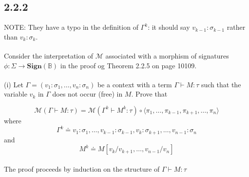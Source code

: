\documentclass{article}
\newcommand{\mbf}{\mathbf}
\begin{document}
\subsection*{2.2.2}

NOTE: They have a typo in the definition of $\Gamma^k$: it should say $v_{k-1} : \sigma_{k-1}$ rather than $v_k : \sigma_k$.\\~\\
Consider the interpretation of $\mathcal M$ associated with a morphism of signatures $\phi : \Sigma \to \mbf{Sign}(\mathbb B)$
in the proof og Theorem 2.2.5 on page 10109. \\~\\
(i) Let $\Gamma = (v_1 : \sigma_1, \ldots, v_n : \sigma_n)$ be a context with a term $\Gamma \vdash M : \tau$ such that
the variable $v_k$ in $\Gamma$ does not occur (free) in $M$. Prove that 

$$ \mathcal M(\Gamma \vdash M : \tau) = \mathcal M(\Gamma^k \vdash M^k : \tau) \circ \langle \pi_1, \ldots, \pi_{k-1},\pi_{k+1}, \ldots, \pi_n \rangle $$
where
$$ \Gamma^k \doteq v_1 : \sigma_1, \ldots, v_{k-1} : \sigma_{k-1}, v_k : \sigma_{k+1}, \ldots, v_{n-1} : \sigma_n $$
and
$$ M^k \doteq M[v_k/v_{k+1},\ldots,v_{n-1}/v_n]$$~\\

The proof proceeds by induction on the structure of $\Gamma \vdash M : \tau$
\end{document}
